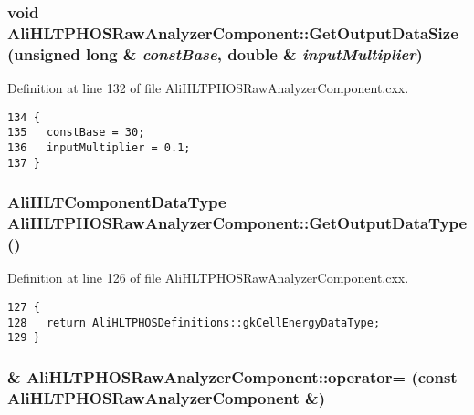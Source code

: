 \subsubsection{\setlength{\rightskip}{0pt plus 5cm}void Ali\-HLTPHOSRaw\-Analyzer\-Component::Get\-Output\-Data\-Size (unsigned long \& {\em const\-Base}, double \& {\em input\-Multiplier})\hspace{0.3cm}{\tt  [virtual]}}\label{classAliHLTPHOSRawAnalyzerComponent_AliHLTPHOSRawAnalyzerPeakFinderComponenta15}




Definition at line 132 of file Ali\-HLTPHOSRaw\-Analyzer\-Component.cxx.

\footnotesize\begin{verbatim}134 {
135   constBase = 30;
136   inputMultiplier = 0.1;
137 }
\end{verbatim}\normalsize 


\subsubsection{\setlength{\rightskip}{0pt plus 5cm}Ali\-HLTComponent\-Data\-Type Ali\-HLTPHOSRaw\-Analyzer\-Component::Get\-Output\-Data\-Type ()\hspace{0.3cm}{\tt  [virtual]}}\label{classAliHLTPHOSRawAnalyzerComponent_AliHLTPHOSRawAnalyzerPeakFinderComponenta14}




Definition at line 126 of file Ali\-HLTPHOSRaw\-Analyzer\-Component.cxx.

\footnotesize\begin{verbatim}127 {
128   return AliHLTPHOSDefinitions::gkCellEnergyDataType;
129 }
\end{verbatim}\normalsize 


\subsubsection{\& Ali\-HLTPHOSRaw\-Analyzer\-Component::operator= (const {\bf Ali\-HLTPHOSRaw\-Analyzer\-Component} \&)\hspace{0.3cm}{\tt  [inline]}}\label{classAliHLTPHOSRawAnalyzerComponent_AliHLTPHOSRawAnalyzerComponenta3}




